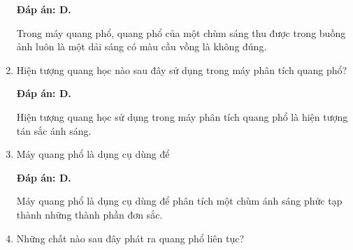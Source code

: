 \begin{enumerate}[label=\bfseries Câu \arabic*:]
	\loigiai
	{		\textbf{Đáp án: D.}
		
Trong máy quang phổ, quang phổ của một chùm sáng thu được trong buồng ảnh luôn là một dải sáng có màu cầu vồng là không đúng.
		
	}
	
	\item {} 
	\cauhoi
	{Hiện tượng quang học nào sau đây sử dụng trong máy phân tích quang phổ?
	}
	
	\loigiai
	{		\textbf{Đáp án: D.}
		
Hiện tượng quang học sử dụng trong máy phân tích quang phổ là hiện tượng tán sắc ánh sáng.
		
	}
	
	\item {} 
	\cauhoi
	{Máy quang phổ là dụng cụ dùng để
	}
	
	\loigiai
	{		\textbf{Đáp án: D.}
		
Máy quang phổ là dụng cụ dùng để phân tích một chùm ánh sáng phức tạp thành những thành phần đơn sắc. 
		
	}
	
	\item {} 
	\cauhoi
	{Những chất nào sau đây phát ra quang phổ liên tục?
	}
	

\end{enumerate}
